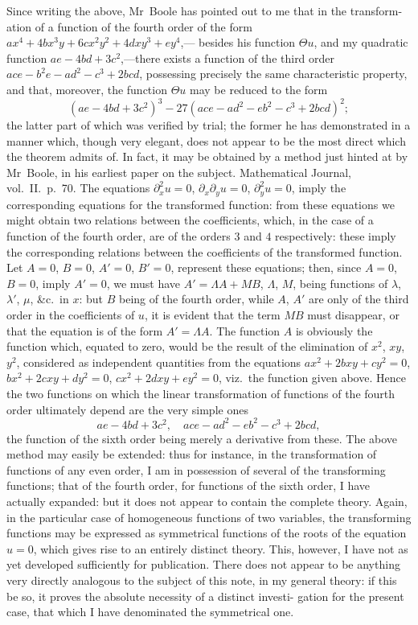 \documentclass[11pt,a4paper]{article}
\theoremstyle{plain}
\theoremstyle{definition}
\theoremstyle{remark}
\begin{document}
Since writing the above, Mr~Boole has pointed out to me that in the transform-
ation of a function of the fourth order of the form $ax^4 + 4bx^3y + 6cx^2y^2 + 4dxy^3 + ey^4$,---
besides his function $\Theta u$, and my quadratic function $ae - 4bd + 3c^2$,---there exists a
function of the third order $ace - b^2e - ad^2 - c^3 + 2bcd$, possessing precisely the same
characteristic property, and that, moreover, the function $\Theta u$ may be reduced to the form
\[
(ae - 4bd + 3c^2)^3 - 27(ace - ad^2 - eb^2 - c^3 + 2bcd)^2;
\]
the latter part of which was verified by trial; the former he has demonstrated in a
manner which, though very elegant, does not appear to be the most direct which the
theorem admits of. In fact, it may be obtained by a method just hinted at by
Mr~Boole, in his earliest paper on the subject. Mathematical Journal, vol.~II.\ p.~70.
The equations $\partial_x^2 u = 0$, $\partial_x\partial_y u = 0$, $\partial_y^2 u = 0$, imply the corresponding equations for the
transformed function: from these equations we might obtain two relations between
the coefficients, which, in the case of a function of the fourth order, are of the orders $3$
and $4$ respectively: these imply the corresponding relations between the coefficients of
the transformed function. Let $A=0$, $B=0$, $A'=0$, $B'=0$, represent these equations;
then, since $A=0$, $B=0$, imply $A'=0$, we must have $A' = \Lambda A + MB$, $\Lambda$, $M$, being
functions of $\lambda$, $\lambda'$, $\mu$, \&c.\ in $x$: but $B$ being of the fourth order, while $A$, $A'$ are only of
the third order in the coefficients of $u$, it is evident that the term $MB$ must disappear,
or that the equation is of the form $A' = \Lambda A$. The function $A$ is obviously the function
which, equated to zero, would be the result of the elimination of $x^2$, $xy$, $y^2$, considered
as independent quantities from the equations $ax^2 + 2bxy + cy^2 = 0$, $bx^2 + 2cxy + dy^2 = 0$,
$cx^2 + 2dxy + ey^2 = 0$, viz.\ the function given above. Hence the two functions on which
the linear transformation of functions of the fourth order ultimately depend are the
very simple ones
\[
ae - 4bd + 3c^2, \quad ace - ad^2 - eb^2 - c^3 + 2bcd,
\]
the function of the sixth order being merely a derivative from these. The above
method may easily be extended: thus for instance, in the transformation of functions of
any even order, I am in possession of several of the transforming functions; that of the
fourth order, for functions of the sixth order, I have actually expanded: but it does not
appear to contain the complete theory. Again, in the particular case of homogeneous
functions of two variables, the transforming functions may be expressed as symmetrical
functions of the roots of the equation $u = 0$, which gives rise to an entirely distinct
theory. This, however, I have not as yet developed sufficiently for publication. There
does not appear to be anything very directly analogous to the subject of this note, in
my general theory: if this be so, it proves the absolute necessity of a distinct investi-
gation for the present case, that which I have denominated the symmetrical one.
\end{document}
